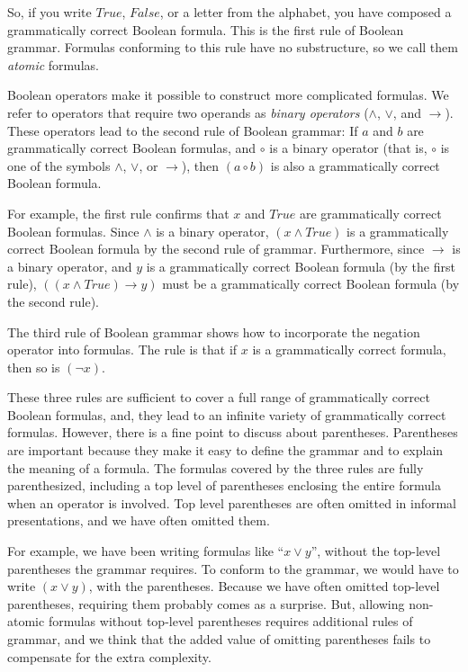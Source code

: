 So, if you write $True$, $False$, or a letter from the alphabet,
you have composed a grammatically correct Boolean formula.
This is the first rule of Boolean grammar.
Formulas conforming to this rule have no substructure,
so we call them \emph{atomic} formulas.

Boolean operators make it possible to construct more complicated formulas.
We refer to operators that require two operands as \emph{binary operators }
($\wedge$, $\vee$, and $\rightarrow$).
These operators lead to the second rule of Boolean grammar:
If $a$ and $b$ are grammatically correct Boolean formulas,
 and $\circ$ is a binary operator
 (that is, $\circ$ is one of the symbols $\wedge$, $\vee$, or $\rightarrow$),
 then $(a \circ b)$ is also a grammatically correct Boolean formula.

For example, the first rule confirms that $x$ and $True$ are
grammatically correct Boolean formulas. Since $\wedge$ is a binary operator,
$(x \wedge True)$ is a grammatically correct Boolean formula by the
second rule of grammar. Furthermore, since $\rightarrow$ is a binary operator,
and $y$ is a grammatically correct Boolean formula (by the first rule),
$((x \wedge True) \rightarrow y)$ must be a grammatically correct
Boolean formula (by the second rule).

The third rule of Boolean grammar shows how to incorporate the negation operator into formulas.
The rule is that if $x$ is a grammatically correct formula, then so is $(\neg x)$.

These three rules are sufficient to
cover a full range of grammatically correct Boolean formulas,
and, they lead to an infinite variety of grammatically correct formulas.
However, there is a fine point to discuss about parentheses.
Parentheses are important because they make it easy to define
the grammar and to explain the meaning of a formula.
The formulas covered by the three rules are fully parenthesized,
including a top level of parentheses enclosing the entire formula
when an operator is involved.
Top level parentheses are often omitted in informal presentations,
and we have often omitted them.

For example, we have been writing formulas like ``$x \vee y$'',
without the top-level parentheses
the grammar requires.
To conform to the grammar,
we would have to write $(x \vee y)$, with the parentheses.
Because we have often omitted top-level parentheses,
requiring them probably comes as a surprise.
But, allowing non-atomic formulas without top-level parentheses
requires additional rules of grammar,
and we think that the added value of omitting parentheses
fails to compensate for the extra complexity.

